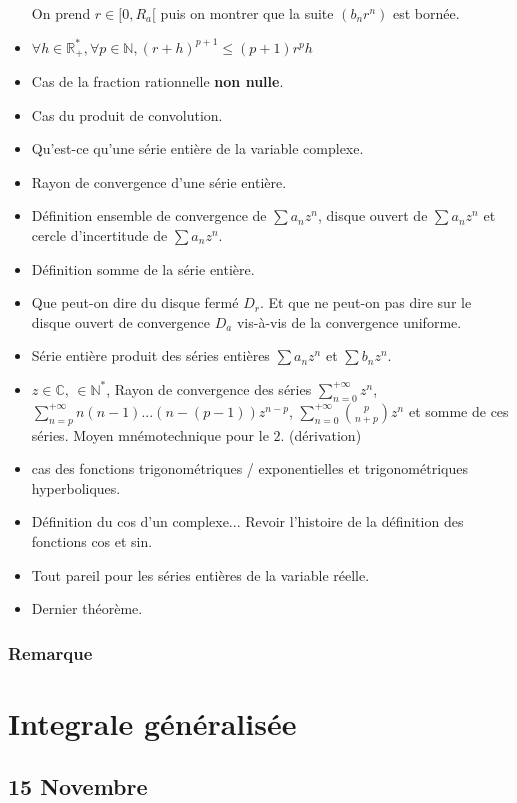 \documentclass[a4paper, 11pt, hidelinks]{article}
\newcommand{\dsum}[2]{\displaystyle\sum_{#1}^{#2} }
\begin{document}
\begin{itemize}
    On prend $r\in [0,R_a[$ puis on montrer que la suite $(b_nr^n)$ est bornée.
    \item $\forall h \in \mathbb{R}^*_+, \forall p \in \mathbb{N}, (r+h)^{p+1} \leq (p+1)r^ph$
    \item Cas de la fraction rationnelle \textbf{non nulle}.
    \item Cas du produit de convolution.
    \item Qu'est-ce qu'une série entière de la variable complexe.
    \item Rayon de convergence d'une série entière.
    \item Définition ensemble de convergence de $\sum a_nz^n$, disque ouvert de $\sum a_nz^n$ et cercle d'incertitude de $\sum a_nz^n$.
    \item Définition somme de la série entière.
    \item Que peut-on dire du disque fermé $D_r$. Et que ne peut-on pas dire sur le disque ouvert de convergence $D_a$ vis-à-vis de la convergence uniforme.
    \item Série entière produit des séries entières $\sum a_n z^n$ et $\sum b_n z^n$.
    \item $z\in \mathbb{C}$, $\in \mathbb{N}^*$, Rayon de convergence des séries $\dsum{n=0}{+\infty} z^n$, $\dsum{n=p}{+ \infty} n(n-1)...(n-(p-1))z^{n-p}$, $\dsum{n=0}{+ \infty} \binom{p}{n+p}z^n$
    et somme de ces séries. Moyen mnémotechnique pour le $2$. (dérivation)
    \item cas des fonctions trigonométriques / exponentielles et trigonométriques hyperboliques.
    \item Définition du cos d'un complexe... Revoir l'histoire de la définition des fonctions cos et sin.
    \item Tout pareil pour les séries entières de la variable réelle.
    \item Dernier théorème.
\end{itemize}




\subsubsection{Remarque}



\section{Integrale généralisée}

\subsection{15 Novembre}
\end{document}
